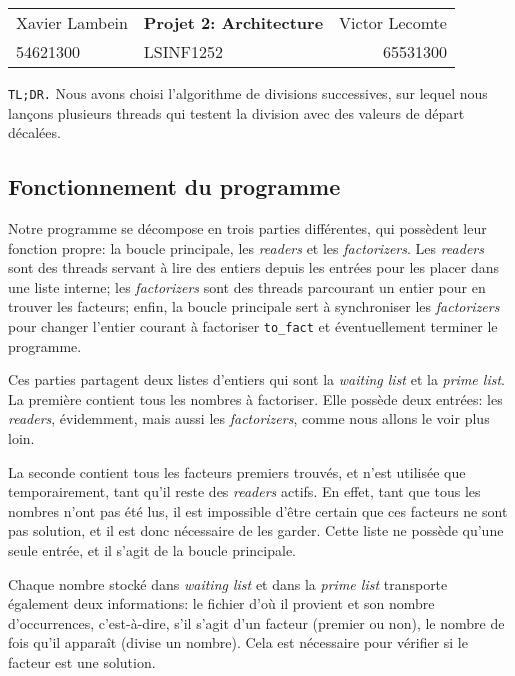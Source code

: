 \documentclass[a4paper,10pt]{article}
\begin{document}
\begin{center}
\begin{tabu} to \textwidth {lX[c]r}
    Xavier Lambein & \large{\textbf{Projet 2: Architecture}} & Victor Lecomte \\
    54621300 & LSINF1252 & 65531300 \\
    \hline
\end{tabu}
\end{center}

\vspace{0.7cm}

\texttt{TL;DR.} Nous avons choisi l'algorithme de divisions successives, sur lequel nous lançons plusieurs threads qui testent la division avec des valeurs de départ décalées.

\subsection*{Fonctionnement du programme}

Notre programme se décompose en trois parties différentes, qui possèdent leur fonction propre: la boucle principale, les \emph{readers} et les \emph{factorizers}. Les \emph{readers} sont des threads servant à lire des entiers depuis les entrées pour les placer dans une liste interne; les \emph{factorizers} sont des threads parcourant un entier pour en trouver les facteurs; enfin, la boucle principale sert à synchroniser les \emph{factorizers} pour changer l'entier courant à factoriser \texttt{to\_fact} et éventuellement terminer le programme.

Ces parties partagent deux listes d'entiers qui sont la \emph{waiting list} et la \emph{prime list}. La première contient tous les nombres à factoriser. Elle possède deux entrées: les \emph{readers}, évidemment, mais aussi les \emph{factorizers}, comme nous allons le voir plus loin.

La seconde contient tous les facteurs premiers trouvés, et n'est utilisée que temporairement, tant qu'il reste des \emph{readers} actifs. En effet, tant que tous les nombres n'ont pas été lus, il est impossible d'être certain que ces facteurs ne sont pas solution, et il est donc nécessaire de les garder. Cette liste ne possède qu'une seule entrée, et il s'agit de la boucle principale.

Chaque nombre stocké dans \emph{waiting list} et dans la \emph{prime list} transporte également deux informations: le fichier d'où il provient et son nombre d'occurrences, c'est-à-dire, s'il s'agit d'un facteur (premier ou non), le nombre de fois qu'il apparaît (divise un nombre). Cela est nécessaire pour vérifier si le facteur est une solution.
\end{document}
